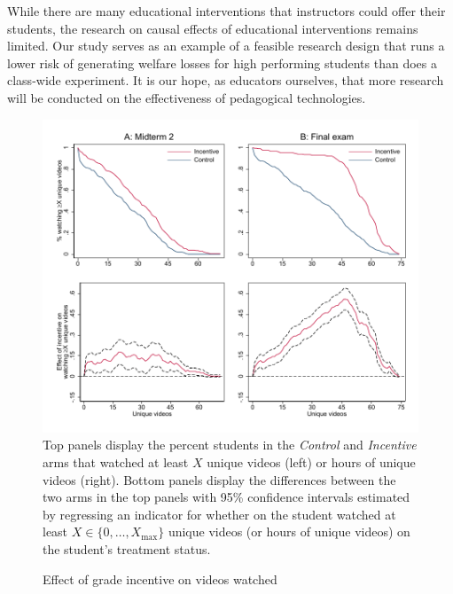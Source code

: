 \documentclass[12pt]{article}
\begin{document}
While there are many educational interventions that instructors could offer their students, the research on causal effects of educational interventions remains limited.
Our study serves as an example of a feasible research design that runs a lower risk of generating welfare losses for high performing students than does a class-wide experiment.
It is our hope, as educators ourselves, that more research will be conducted on the effectiveness of pedagogical technologies.

\printbibliography


\clearpage


\clearpage


\clearpage


\clearpage


\clearpage


\clearpage



\clearpage
\begin{figure}[t]
\begin{center}
\caption{Effect of grade incentive on videos watched}
\label{combo_cdf}
\includegraphics[width=1\textwidth, angle=0]{../plots/combo_cdf}
\footnotesize Top panels display the percent students in the \textit{Control}
 and \textit{Incentive} arms that watched at least $X$ unique videos (left) or hours of unique videos (right).
 Bottom panels display the differences between the two arms in the top panels with 95\% confidence intervals estimated by regressing an indicator for whether on the student watched at least $X\in\{0,\dots,X_{\max}\}$ unique videos (or hours of unique videos) on the student's treatment status.
\end{center}
\end{figure}
\end{document}
